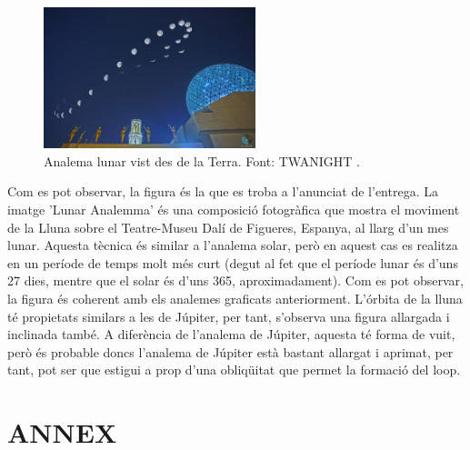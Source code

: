 \documentclass[a4paper, 11pt]{article}
\begin{document}
\begin{figure}[h!]
    \centering
    \includegraphics[width=0.55\textwidth]{images/analema_luna.jpg}
    \caption{Analema lunar vist des de la Terra. Font: TWANIGHT \cite{ANALEMA_MOON}.}
    \label{fig:analema_luna}
\end{figure}

\vspace{2mm}

\noindent Com es pot observar, la figura és la que es troba a l'anunciat de l'entrega. La imatge 'Lunar Analemma' és una composició fotogràfica que mostra el moviment de la Lluna sobre el Teatre-Museu Dalí de Figueres, Espanya, al llarg d'un mes lunar. Aquesta tècnica és similar a l'analema solar, però en aquest cas es realitza en un període de temps molt més curt (degut al fet que el període lunar és d'uns 27 dies, mentre que el solar és d'uns 365, aproximadament). Com es pot observar, la figura és coherent amb els analemes graficats anteriorment. L'órbita de la lluna té propietats similars a les de Júpiter, per tant, s'observa una figura allargada i inclinada també. A diferència de l'analema de Júpiter, aquesta té forma de vuit, però és probable doncs l'analema de Júpiter està bastant allargat i aprimat, per tant, pot ser que estigui a prop d'una obliqüitat que permet la formació del loop.




\newpage
\section*{ANNEX}
\end{document}
